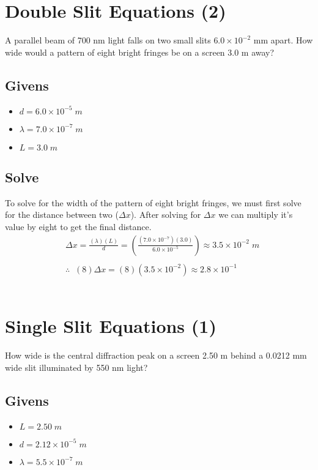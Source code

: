 \documentclass{article}
\begin{document}
\section{Double Slit Equations (2)}
A parallel beam of 700 nm light falls on two small slits $6.0 \times 10^{-2}$ mm apart. How wide would a pattern of eight bright fringes be on a screen 3.0 m away?
\subsection*{Givens}
\begin{itemize}
    \item $d = 6.0 \times 10^{-5}\;m$
    \item $\lambda = 7.0 \times 10^{-7}\;m$
    \item $L = 3.0\;m$
\end{itemize}\leavevmode

\subsection*{Solve}
To solve for the width of the pattern of eight bright fringes, we must first solve for the distance between two ($\Delta x$). After solving for $\Delta x$ we can multiply it's value by eight to get the final distance.\\
\begin{align*}
     & \Delta x = \frac{(\lambda)(L)}{d} = \left(\frac{(7.0 \times 10^{-7})(3.0)}{6.0 \times 10^{-5}}\right) \approx 3.5 \times 10^{-2}\;m \\\\
     & \therefore\;\;(8)\Delta x = (8)(3.5 \times 10^{-2}) \approx 2.8 \times 10^{-1}
\end{align*}\leavevmode\\



\section{Single Slit Equations (1)}
How wide is the central diffraction peak on a screen 2.50 m behind a 0.0212 mm wide slit illuminated by 550 nm light?
\subsection*{Givens}
\begin{itemize}
    \item $L = 2.50\;m$
    \item $d = 2.12 \times 10^{-5}\;m$
    \item $\lambda = 5.5 \times 10^{-7}\;m$
\end{itemize}\leavevmode
\end{document}
